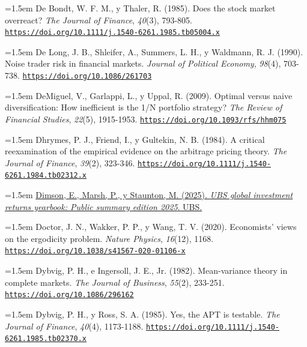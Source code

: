 \documentclass[10pt,a4paper]{article}
\begin{document}
\noindent\hangindent=1.5em De Bondt, W. F. M., y Thaler, R. (1985). Does the stock market overreact? \textit{The Journal of Finance}, \textit{40}(3), 793-805. \href{https://doi.org/10.1111/j.1540-6261.1985.tb05004.x}{\nolinkurl{https://doi.org/10.1111/j.1540-6261.1985.tb05004.x}}

\noindent\hangindent=1.5em De Long, J. B., Shleifer, A., Summers, L. H., y Waldmann, R. J. (1990). Noise trader risk in financial markets. \textit{Journal of Political Economy}, \textit{98}(4), 703-738. \href{https://doi.org/10.1086/261703}{\nolinkurl{https://doi.org/10.1086/261703}}

\noindent\hangindent=1.5em DeMiguel, V., Garlappi, L., y Uppal, R. (2009). Optimal versus naive diversification: How inefficient is the 1/N portfolio strategy? \textit{The Review of Financial Studies}, \textit{22}(5), 1915-1953. \href{https://doi.org/10.1093/rfs/hhm075}{\nolinkurl{https://doi.org/10.1093/rfs/hhm075}}

{\sloppy\noindent\hangindent=1.5em Dhrymes, P. J., Friend, I., y Gultekin, N. B. (1984). A critical reexamination of the empirical evidence on the arbitrage pricing theory. \textit{The Journal of Finance}, \textit{39}(2), 323-346. \href{https://doi.org/10.1111/j.1540-6261.1984.tb02312.x}{\nolinkurl{https://doi.org/10.1111/j.1540-6261.1984.tb02312.x}}\par}

\noindent\hangindent=1.5em \href{https://www.ubs.com/global/en/investment-bank/insights-and-data/2025/global-investment-returns-yearbook-2025.html}{Dimson, E., Marsh, P., y Staunton, M. (2025). \textit{UBS global investment returns yearbook: Public summary edition 2025}. UBS.}

\noindent\hangindent=1.5em Doctor, J. N., Wakker, P. P., y Wang, T. V. (2020). Economists' views on the ergodicity problem. \textit{Nature Physics}, \textit{16}(12), 1168. \href{https://doi.org/10.1038/s41567-020-01106-x}{\nolinkurl{https://doi.org/10.1038/s41567-020-01106-x}}

\noindent\hangindent=1.5em Dybvig, P. H., e Ingersoll, J. E., Jr. (1982). Mean-variance theory in complete markets. \textit{The Journal of Business}, \textit{55}(2), 233-251. \href{https://doi.org/10.1086/296162}{\nolinkurl{https://doi.org/10.1086/296162}}

\noindent\hangindent=1.5em Dybvig, P. H., y Ross, S. A. (1985). Yes, the APT is testable. \textit{The Journal of Finance}, \textit{40}(4), 1173-1188. \href{https://doi.org/10.1111/j.1540-6261.1985.tb02370.x}{\nolinkurl{https://doi.org/10.1111/j.1540-6261.1985.tb02370.x}}
\end{document}
